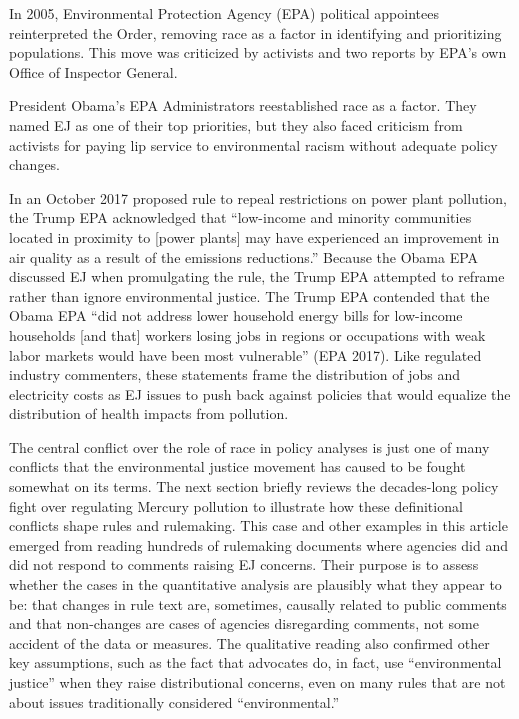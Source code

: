 \documentclass[
      12pt,
        ]{article}
\begin{document}
In 2005, Environmental Protection Agency (EPA) political appointees reinterpreted the Order, removing race as a factor in identifying and prioritizing populations. This move was criticized by activists and two reports by EPA's own Office of Inspector General.

President Obama's EPA Administrators reestablished race as a factor. They named EJ as one of their top priorities, but they also faced criticism from activists for paying lip service to environmental racism without adequate policy changes.

In an October 2017 proposed rule to repeal
restrictions on power plant pollution, the Trump EPA acknowledged that
``low-income and minority communities located in proximity to {[}power
plants{]} may have experienced an improvement in air quality as a result
of the emissions reductions.'' Because the Obama EPA discussed
EJ when promulgating the rule, the Trump EPA attempted to reframe rather than ignore environmental justice. The Trump EPA contended that the Obama EPA ``did not address lower household energy bills for low-income households {[}and that{]} workers losing jobs in regions or occupations with weak labor markets would have been most vulnerable'' (EPA 2017). Like regulated industry commenters, these statements frame the distribution of jobs and electricity costs as EJ issues to push back against policies that would equalize the distribution of health impacts from pollution.

The central conflict over the role of race in policy analyses is just one of many conflicts that the environmental justice movement has caused to be fought somewhat on its terms. The next section briefly reviews the decades-long policy fight over regulating Mercury pollution to illustrate how these definitional conflicts shape rules and rulemaking. This case and other examples in this article emerged from reading hundreds of rulemaking documents where agencies did and did not respond to comments raising EJ concerns. Their purpose is to assess whether the cases in the quantitative analysis are plausibly what they appear to be: that changes in rule text are, sometimes, causally related to public comments and that non-changes are cases of agencies disregarding comments, not some accident of the data or measures.
The qualitative reading also confirmed other key assumptions, such as the fact that advocates do, in fact, use ``environmental justice'' when they raise distributional concerns, even on many rules that are not about issues traditionally considered ``environmental.''
\end{document}

